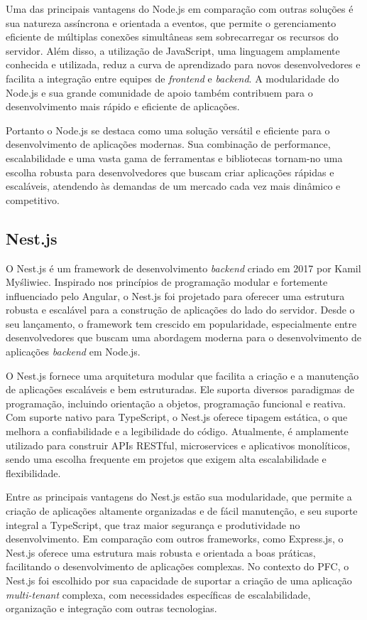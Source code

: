 Uma das principais vantagens do Node.js em comparação com outras soluções é sua natureza assíncrona e orientada a eventos, que permite o gerenciamento eficiente de múltiplas conexões simultâneas sem sobrecarregar os recursos do servidor. Além disso, a utilização de JavaScript, uma linguagem amplamente conhecida e utilizada, reduz a curva de aprendizado para novos desenvolvedores e facilita a integração entre equipes de \textit{frontend} e \textit{backend}. A modularidade do Node.js e sua grande comunidade de apoio também contribuem para o desenvolvimento mais rápido e eficiente de aplicações.

Portanto o Node.js se destaca como uma solução versátil e eficiente para o desenvolvimento de aplicações modernas. Sua combinação de performance, escalabilidade e uma vasta gama de ferramentas e bibliotecas tornam-no uma escolha robusta para desenvolvedores que buscam criar aplicações rápidas e escaláveis, atendendo às demandas de um mercado cada vez mais dinâmico e competitivo.

\subsection{Nest.js}

O Nest.js é um framework de desenvolvimento \textit{backend} criado em 2017 por Kamil Myśliwiec. Inspirado nos princípios de programação modular e fortemente influenciado pelo Angular, o Nest.js foi projetado para oferecer uma estrutura robusta e escalável para a construção de aplicações do lado do servidor. Desde o seu lançamento, o framework tem crescido em popularidade, especialmente entre desenvolvedores que buscam uma abordagem moderna para o desenvolvimento de aplicações \textit{backend} em Node.js.

O Nest.js fornece uma arquitetura modular que facilita a criação e a manutenção de aplicações escaláveis e bem estruturadas. Ele suporta diversos paradigmas de programação, incluindo orientação a objetos, programação funcional e reativa. Com suporte nativo para TypeScript, o Nest.js oferece tipagem estática, o que melhora a confiabilidade e a legibilidade do código. Atualmente, é amplamente utilizado para construir APIs RESTful, microservices e aplicativos monolíticos, sendo uma escolha frequente em projetos que exigem alta escalabilidade e flexibilidade.

Entre as principais vantagens do Nest.js estão sua modularidade, que permite a criação de aplicações altamente organizadas e de fácil manutenção, e seu suporte integral a TypeScript, que traz maior segurança e produtividade no desenvolvimento. Em comparação com outros frameworks, como Express.js, o Nest.js oferece uma estrutura mais robusta e orientada a boas práticas, facilitando o desenvolvimento de aplicações complexas. No contexto do \acrlong{PFC}, o Nest.js foi escolhido por sua capacidade de suportar a criação de uma aplicação \textit{multi-tenant} complexa, com necessidades específicas de escalabilidade, organização e integração com outras tecnologias.

